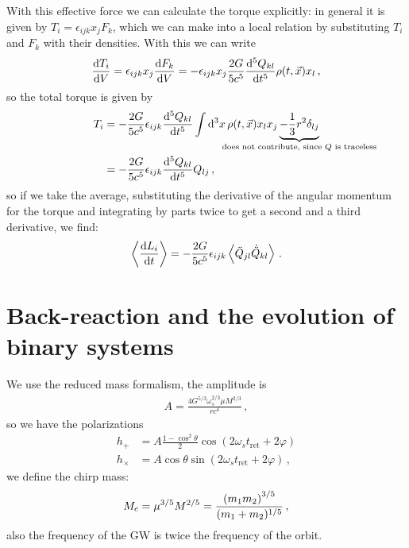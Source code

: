 \documentclass[main.tex]{subfiles}
\begin{document}
With this effective force we can calculate the torque explicitly: in general it is given by \(T_i = \epsilon_{ijk} x_j F_k\), which we can make into a local relation by substituting \(T_i\) and \(F_k\) with their densities. With this we can write 
%
\begin{align}
\dv{T_i}{V} = \epsilon_{ijk} x_j  \dv{F_k}{V} = -
\epsilon_{ijk} x_j  \frac{2G}{5 c^{5}} \dv[5]{Q_{kl}}{t} \rho (t, \vec{x}) x_l
\,,
\end{align}
%
so the total torque is given by
%
\begin{align}
T_{i} &= - \frac{2G}{5 c^{5}} \epsilon_{ijk} \dv[5]{Q_{kl}}{t}
\int \dd[3]{x} \rho (t, \vec{x}) x_l x_j \underbrace{- \frac{1}{3} r^2 \delta_{lj}}_{\mathclap{\text{does not contribute, since \(Q\) is traceless}}} \\
&= - \frac{2G}{5 c^{5}} \epsilon_{ijk} \dv[5]{Q_{kl}}{t} Q_{lj} 
\,,
\end{align}
%
so if we take the average, substituting the derivative of the angular momentum for the torque and integrating by parts twice to get a second and a third derivative, we find:
%
\begin{align}
\expval{\dv{L_{i}}{t}} = -\frac{2G}{5c^{5}} \epsilon_{ijk} 
\expval{\ddot{Q}_{jl} \dot{\ddot{Q}}_{kl}}
\,.
\end{align}

\section{Back-reaction and the evolution of binary systems}

We use the reduced mass formalism, the amplitude is 
%
\begin{align}
A = \frac{4 G^{5/3} \omega_{s}^{2/3} \mu M^{2/3}}{r c^{4}}
\,,
\end{align}
%
so we have the polarizations 
%
\begin{subequations}
\begin{align}
h_{+} &= A \frac{1 - \cos^2\theta   }{2} \cos(2 \omega_{s} t _{\text{ret}} + 2 \varphi ) \\ 
h_{\times } &= A \cos \theta  \sin(2 \omega_{s} t _{\text{ret}} + 2 \varphi )  
\,,
\end{align}
\end{subequations}
%
we define the chirp mass: 
%
\begin{align}
M_c = \mu ^{3/5} M^{2/5} = \frac{\qty(m_1 m_2 )^{3/5}}{(m_1 + m_2 )^{1/5}}
\,,
\end{align}
%
also the frequency of the GW is twice the frequency of the orbit. 
\end{document}
